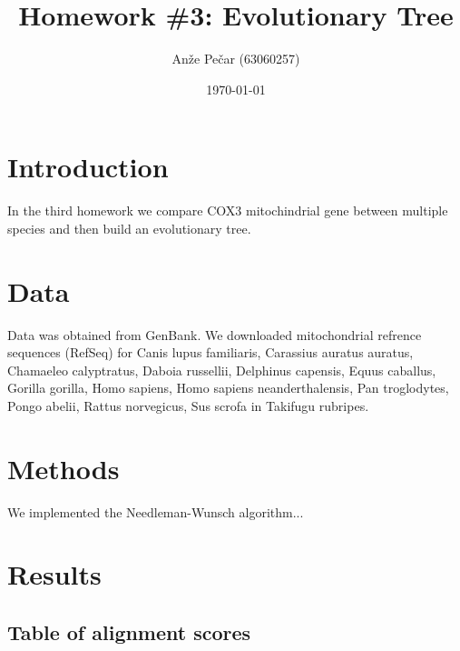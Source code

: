 \documentclass[a4paper,11pt]{article}
\title{Homework \#3: Evolutionary Tree}
\author{Anže Pečar (63060257)}
\date{\today}
\begin{document}
\maketitle

\section{Introduction}

In the third homework we compare COX3 mitochindrial gene between multiple species and then build an evolutionary tree.

\section{Data}

Data was obtained from GenBank. We downloaded mitochondrial refrence sequences (RefSeq) for Canis lupus familiaris, Carassius auratus auratus, Chamaeleo calyptratus, Daboia russellii, Delphinus capensis, Equus caballus, Gorilla gorilla, Homo sapiens, Homo sapiens neanderthalensis, Pan troglodytes, Pongo abelii, Rattus norvegicus, Sus scrofa in Takifugu rubripes.

\section{Methods}

We implemented the Needleman-Wunsch algorithm...

\section{Results}

\subsection{Table of alignment scores}
\end{document}
